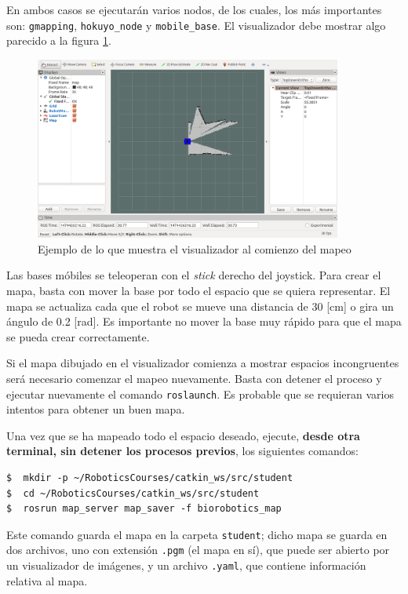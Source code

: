 \documentclass[letterpaper,12pt]{article}
\begin{document}
En ambos casos se ejecutarán varios nodos, de los cuales, los más importantes son: \texttt{gmapping}, \texttt{hokuyo\_node} y \texttt{mobile\_base}. El visualizador debe mostrar algo parecido a la figura \ref{fig:rviz}.

\begin{figure}
\centering
\includegraphics[width=0.9\textwidth]{Figures/rviz_mapping.png}
\caption{Ejemplo de lo que  muestra el visualizador al comienzo del mapeo}
\label{fig:rviz}
\end{figure}

Las bases móbiles se teleoperan con el \textit{stick} derecho del joystick. Para crear el mapa, basta con mover la base por todo el espacio que se quiera representar. El mapa se actualiza cada que el robot se mueve una distancia de 30 [cm] o gira un ángulo de 0.2 [rad]. Es importante no mover la base muy rápido para que el mapa se pueda crear correctamente. 

Si el mapa dibujado en el visualizador comienza a mostrar espacios incongruentes será necesario comenzar el mapeo nuevamente. Basta con detener el proceso y ejecutar nuevamente el comando \texttt{roslaunch}. Es probable que se requieran varios intentos para obtener un buen mapa. 

Una vez que se ha mapeado todo el espacio deseado, ejecute, \textbf{desde otra terminal, sin detener los procesos previos}, los siguientes comandos:
\begin{verbatim}
$  mkdir -p ~/RoboticsCourses/catkin_ws/src/student
$  cd ~/RoboticsCourses/catkin_ws/src/student
$  rosrun map_server map_saver -f biorobotics_map
\end{verbatim}
Este comando guarda el mapa en la carpeta \texttt{student}; dicho mapa se guarda en dos archivos, uno con extensión \texttt{.pgm} (el mapa en sí), que puede ser abierto por un visualizador de imágenes, y un archivo \texttt{.yaml}, que contiene información relativa al mapa. 
\end{document}
